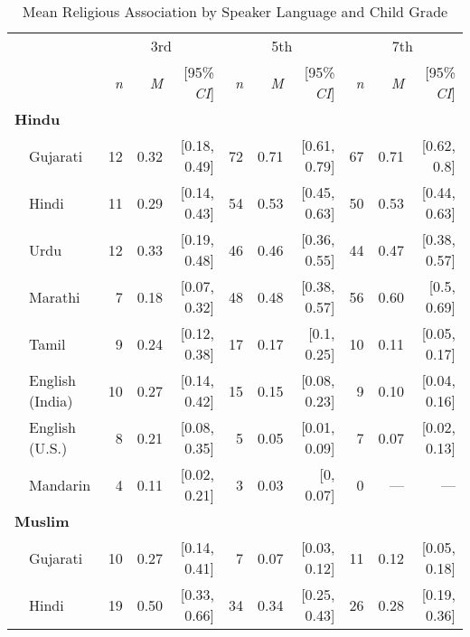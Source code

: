 \thispagestyle{empty}
\begin{table}[t]
\vspace{-20pt}
\centering
\caption{Mean Religious Association by Speaker Language and Child Grade\label{tab:religion-means}}
\begin{footnotesize}
\begin{tabular}{p{.1in}lrrrrrrrrr}
\toprule
 &  & \multicolumn{3}{c}{3rd} & \multicolumn{3}{c}{5th} & \multicolumn{3}{c}{7th} \\
\cline{3-5} \cline{6-8} \cline{9-11}
&  & \textit{n} & \textit{M} & [95\% \textit{CI}] &  \textit{n} & \textit{M} & [95\% \textit{CI}] &  \textit{n}  & \textit{M} & [95\% \textit{CI}]\\
\midrule
\multicolumn{11}{l}{\textbf{Hindu}}\\
 & Gujarati & 12 & 0.32 & [0.18, 0.49] & 72 & 0.71 & [0.61, 0.79] & 67 & 0.71 & [0.62, 0.8]\\

 & Hindi & 11 & 0.29 & [0.14, 0.43] & 54 & 0.53 & [0.45, 0.63] & 50 & 0.53 & [0.44, 0.63]\\

 & Urdu & 12 & 0.33 & [0.19, 0.48] & 46 & 0.46 & [0.36, 0.55] & 44 & 0.47 & [0.38, 0.57]\\

 & Marathi & 7 & 0.18 & [0.07, 0.32] & 48 & 0.48 & [0.38, 0.57] & 56 & 0.60 & [0.5, 0.69]\\

 & Tamil & 9 & 0.24 & [0.12, 0.38] & 17 & 0.17 & [0.1, 0.25] & 10 & 0.11 & [0.05, 0.17]\\

 & English (India) & 10 & 0.27 & [0.14, 0.42] & 15 & 0.15 & [0.08, 0.23] & 9 & 0.10 & [0.04, 0.16]\\

 & English (U.S.) & 8 & 0.21 & [0.08, 0.35] & 5 & 0.05 & [0.01, 0.09] & 7 & 0.07 & [0.02, 0.13]\\

& Mandarin & 4 & 0.11 & [0.02, 0.21] & 3 & 0.03 & [0, 0.07] & 0 & --- & ---\\

\midrule
\multicolumn{11}{l}{\textbf{Muslim}}\\
 & Gujarati & 10 & 0.27 & [0.14, 0.41] & 7 & 0.07 & [0.03, 0.12] & 11 & 0.12 & [0.05, 0.18]\\

 & Hindi & 19 & 0.50 & [0.33, 0.66] & 34 & 0.34 & [0.25, 0.43] & 26 & 0.28 & [0.19, 0.36]\\


\end{tabular}
\end{footnotesize}
\end{table}
